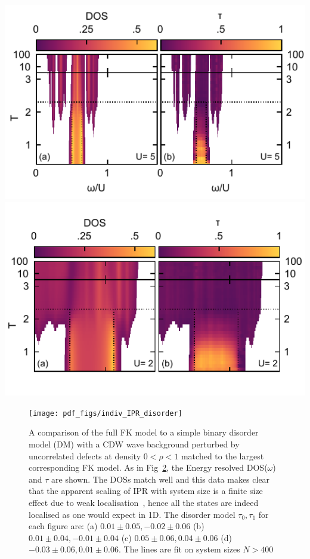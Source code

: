 \includegraphics[width=1\textwidth,height=\textheight]{../figure_code/fk_chapter/gap_opening_high_U} \includegraphics[width=1\textwidth,height=\textheight]{../figure_code/fk_chapter/gap_opening_low_U}

\begin{figure}
\hypertarget{fig:indiv_IPR_disorder}{%
\centering
\texttt{[image: pdf\_figs/indiv\_IPR\_disorder]}
\caption{A comparison of the full FK model to a simple binary disorder model (DM) with a CDW wave background perturbed by uncorrelated defects at density \(0 < \rho < 1\) matched to the largest corresponding FK model. As in Fig~\protect\hyperlink{fig:indiv_IPR}{2}, the Energy resolved DOS(\(\omega\)) and \(\tau\) are shown. The DOSs match well and this data makes clear that the apparent scaling of IPR with system size is a finite size effect due to weak localisation~\autocite{antipovInteractionTunedAndersonMott2016}, hence all the states are indeed localised as one would expect in 1D. The disorder model \(\tau_0,\tau_1\) for each figure are: (a) \(0.01\pm0.05, -0.02\pm0.06\) (b) \(0.01\pm0.04, -0.01\pm0.04\) (c) \(0.05\pm0.06, 0.04\pm0.06\) (d) \(-0.03\pm0.06, 0.01\pm0.06\). The lines are fit on system sizes \(N > 400\)}\label{fig:indiv_IPR_disorder}
}
\end{figure}

